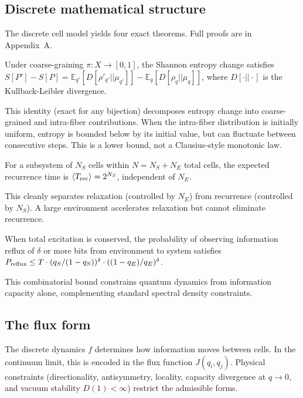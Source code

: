 \documentclass[12pt]{article}
\begin{document}
\subsection{Discrete mathematical structure}

The discrete cell model yields four exact theorems. Full proofs are in Appendix~A.

\begin{theorem}
Under coarse-graining $\pi:X\to[0,1]$, the Shannon entropy change satisfies $S[P']-S[P] = \mathbb{E}_{q'}[D[\rho'_{q'}||\mu_{q'}]] - \mathbb{E}_q[D[\rho_q||\mu_q]]$, where $D[\cdot||\cdot]$ is the Kullback-Leibler divergence.
\end{theorem}

This identity (exact for any bijection) decomposes entropy change into coarse-grained and intra-fiber contributions. When the intra-fiber distribution is initially uniform, entropy is bounded below by its initial value, but can fluctuate between consecutive steps. This is a lower bound, not a Clausius-style monotonic law.

\begin{theorem}
For a subsystem of $N_S$ cells within $N=N_S+N_E$ total cells, the expected recurrence time is $\langle T_{\rm rec}\rangle = 2^{N_S}$, independent of $N_E$.
\end{theorem}

This cleanly separates relaxation (controlled by $N_E$) from recurrence (controlled by $N_S$). A large environment accelerates relaxation but cannot eliminate recurrence.

\begin{theorem}
When total excitation is conserved, the probability of observing information reflux of $\delta$ or more bits from environment to system satisfies $P_{\rm reflux} \le T\cdot(q_S/(1-q_S))^\delta\cdot((1-q_E)/q_E)^\delta$.
\end{theorem}

This combinatorial bound constrains quantum dynamics from information capacity alone, complementing standard spectral density constraints.

\subsection{The flux form}

The discrete dynamics $f$ determines how information moves between cells. In the continuum limit, this is encoded in the flux function $J(q_i,q_j)$. Physical constraints (directionality, antisymmetry, locality, capacity divergence at $q\to 0$, and vacuum stability $D(1)<\infty$) restrict the admissible forms.
\end{document}
